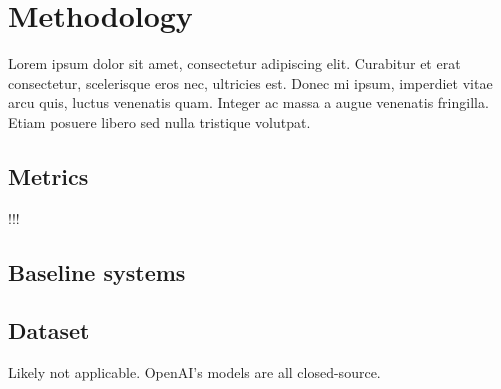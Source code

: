 \section{Methodology}
Lorem ipsum dolor sit amet, consectetur adipiscing elit. Curabitur et erat consectetur, 
scelerisque eros nec, ultricies est. Donec mi ipsum, imperdiet vitae arcu quis, luctus venenatis quam. 
Integer ac massa a augue venenatis fringilla. Etiam posuere libero sed nulla tristique volutpat.

\subsection{Metrics}
!!!

\subsection{Baseline systems}

\subsection{Dataset}
Likely not applicable. OpenAI's models are all closed-source.
